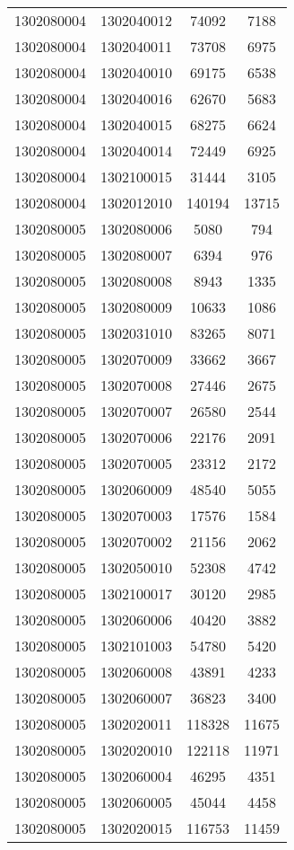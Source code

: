\begin{longtable}[h]{llcc}
		1302080004 & 1302040012 & 74092 & 7188\\
		1302080004 & 1302040011 & 73708 & 6975\\
		1302080004 & 1302040010 & 69175 & 6538\\
		1302080004 & 1302040016 & 62670 & 5683\\
		1302080004 & 1302040015 & 68275 & 6624\\
		1302080004 & 1302040014 & 72449 & 6925\\
		1302080004 & 1302100015 & 31444 & 3105\\
		1302080004 & 1302012010 & 140194 & 13715\\
		1302080005 & 1302080006 & 5080 & 794\\
		1302080005 & 1302080007 & 6394 & 976\\
		1302080005 & 1302080008 & 8943 & 1335\\
		1302080005 & 1302080009 & 10633 & 1086\\
		1302080005 & 1302031010 & 83265 & 8071\\
		1302080005 & 1302070009 & 33662 & 3667\\
		1302080005 & 1302070008 & 27446 & 2675\\
		1302080005 & 1302070007 & 26580 & 2544\\
		1302080005 & 1302070006 & 22176 & 2091\\
		1302080005 & 1302070005 & 23312 & 2172\\
		1302080005 & 1302060009 & 48540 & 5055\\
		1302080005 & 1302070003 & 17576 & 1584\\
		1302080005 & 1302070002 & 21156 & 2062\\
		1302080005 & 1302050010 & 52308 & 4742\\
		1302080005 & 1302100017 & 30120 & 2985\\
		1302080005 & 1302060006 & 40420 & 3882\\
		1302080005 & 1302101003 & 54780 & 5420\\
		1302080005 & 1302060008 & 43891 & 4233\\
		1302080005 & 1302060007 & 36823 & 3400\\
		1302080005 & 1302020011 & 118328 & 11675\\
		1302080005 & 1302020010 & 122118 & 11971\\
		1302080005 & 1302060004 & 46295 & 4351\\
		1302080005 & 1302060005 & 45044 & 4458\\
		1302080005 & 1302020015 & 116753 & 11459\\

\end{longtable}
